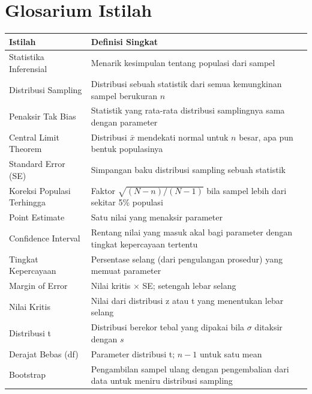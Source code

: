 \documentclass[
  indonesian,
  letterpaper,
]{book}
\newcounter{none} %
\begin{document}

\chapter{Glosarium Istilah}\label{glosarium-istilah}

{\def\LTcaptype{none} %
\begin{longtable}[]{@{}
  >{\raggedright\arraybackslash}p{}
  >{\raggedright\arraybackslash}p{}@{}}
\toprule\noalign{}
\begin{minipage}[b]{\linewidth}\raggedright
Istilah
\end{minipage} & \begin{minipage}[b]{\linewidth}\raggedright
Definisi Singkat
\end{minipage} \\
\midrule\noalign{}
\endhead
\bottomrule\noalign{}
\endlastfoot
Statistika Inferensial & Menarik kesimpulan tentang populasi dari
sampel \\
Distribusi Sampling & Distribusi sebuah statistik dari semua kemungkinan
sampel berukuran \(n\) \\
Penaksir Tak Bias & Statistik yang rata-rata distribusi samplingnya sama
dengan parameter \\
Central Limit Theorem & Distribusi \(\bar{x}\) mendekati normal untuk
\(n\) besar, apa pun bentuk populasinya \\
Standard Error (SE) & Simpangan baku distribusi sampling sebuah
statistik \\
Koreksi Populasi Terhingga & Faktor \(\sqrt{(N-n)/(N-1)}\) bila sampel
lebih dari sekitar 5\% populasi \\
Point Estimate & Satu nilai yang menaksir parameter \\
Confidence Interval & Rentang nilai yang masuk akal bagi parameter
dengan tingkat kepercayaan tertentu \\
Tingkat Kepercayaan & Persentase selang (dari pengulangan prosedur) yang
memuat parameter \\
Margin of Error & Nilai kritis \(\times\) SE; setengah lebar selang \\
Nilai Kritis & Nilai dari distribusi z atau t yang menentukan lebar
selang \\
Distribusi t & Distribusi berekor tebal yang dipakai bila \(\sigma\)
ditaksir dengan \(s\) \\
Derajat Bebas (df) & Parameter distribusi t; \(n-1\) untuk satu mean \\
Bootstrap & Pengambilan sampel ulang dengan pengembalian dari data untuk
meniru distribusi sampling \\
\end{longtable}
}
\end{document}
